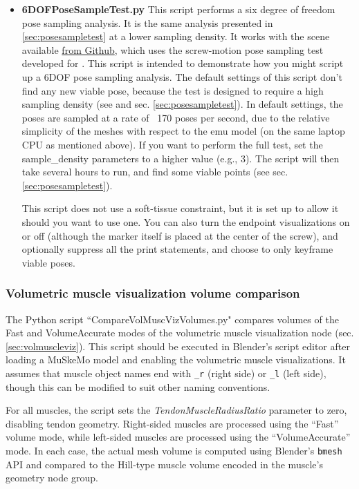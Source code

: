 \documentclass{article}
\begin{document}
\begin{itemize}
    \item \textbf{6DOFPoseSampleTest.py} This script performs a six degree of freedom pose sampling analysis. It is the same analysis presented in \ref{sec:posesampletest} at a lower sampling density. It works with the scene available \href{https://github.com/PashavanBijlert/MuSkeMo/releases/tag/v0.x-posesamplestresstest}{from Github}, which uses the screw-motion pose sampling test developed for \cite{bishopIntelligentSamplingHighdimensional2023}. This script is intended to demonstrate how you might script up a 6DOF pose sampling analysis. The default settings of this script don't find any new viable pose, because the test is designed to require a high sampling density (see \cite{bishopIntelligentSamplingHighdimensional2023} and sec. \ref{sec:posesampletest}). In default settings, the poses are sampled at a rate of ~170 poses per second, due to the relative simplicity of the meshes with respect to the emu model (on the same laptop CPU as mentioned above). If you want to perform the full test, set the sample\_density parameters to a higher value (e.g., 3). The script will then take several hours to run, and find some viable points (see sec. \ref{sec:posesampletest}).

    This script does not use a soft-tissue constraint, but it is set up to allow it should you want to use one. You can also turn the endpoint visualizations on or off (although the marker itself is placed at the center of the screw), and optionally suppress all the print statements, and choose to only keyframe viable poses.


\end{itemize}



\subsubsection{Volumetric muscle visualization volume comparison}
\label{sec:volcomparisonscript}

The Python script ``CompareVolMuscVizVolumes.py" compares volumes of the Fast and VolumeAccurate modes of the volumetric muscle visualization node (sec. \ref{sec:volmuscleviz}). This script should be executed in Blender's script editor after loading a MuSkeMo model and enabling the volumetric muscle visualizations. It assumes that muscle object names end with \texttt{\_r} (right side) or \texttt{\_l} (left side), though this can be modified to suit other naming conventions.

For all muscles, the script sets the \emph{TendonMuscleRadiusRatio} parameter to zero, disabling tendon geometry. Right-sided muscles are processed using the ``Fast'' volume mode, while left-sided muscles are processed using the ``VolumeAccurate'' mode. In each case, the actual mesh volume is computed using Blender's \texttt{bmesh} API and compared to the Hill-type muscle volume encoded in the muscle's geometry node group.
\end{document}

